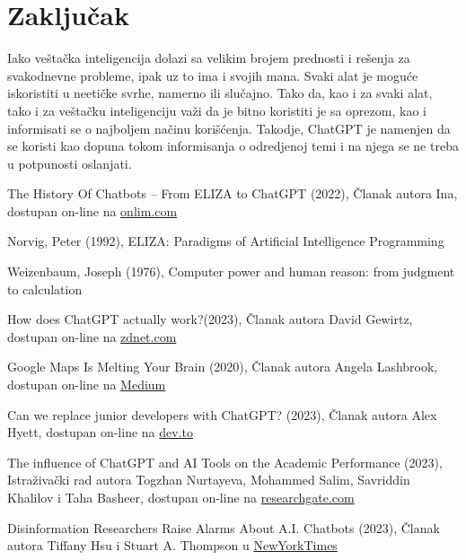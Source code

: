 \documentclass[fleqn, 12pt]{article}
\begin{document}
\newpage
\section{Zaključak}
\begin{text}
Iako veštačka inteligencija dolazi sa velikim brojem prednosti i  rešenja za svakodnevne probleme, ipak uz to ima i svojih mana. Svaki alat je moguće iskoristiti u neetičke svrhe, namerno ili slučajno. Tako da, kao i za svaki alat, tako i za veštačku inteligenciju važi da je bitno koristiti je sa oprezom, kao i informisati se o najboljem načinu korišćenja. Takodje, ChatGPT je namenjen da se koristi kao dopuna tokom informisanja o odredjenoj temi i na njega se ne treba u potpunosti oslanjati.

\end{text}
{
\raggedright
\renewcommand{\refname}{Reference}
\begin{thebibliography}{9}
     The History Of Chatbots – From ELIZA to ChatGPT (2022), Članak autora Ina, dostupan on-line na \href{https://onlim.com/en/the-history-of-chatbots/}{onlim.com}
    
     Norvig, Peter (1992), ELIZA: Paradigms of Artificial Intelligence Programming
    
     Weizenbaum, Joseph (1976), Computer power and human reason: from judgment to calculation
    
     How does ChatGPT actually work?(2023), Članak autora David Gewirtz, dostupan on-line na \href{https://www.zdnet.com/article/how-does-chatgpt-work/}{zdnet.com}
    
     Google Maps Is Melting Your Brain (2020), Članak autora Angela Lashbrook, dostupan on-line na \href{https://debugger.medium.com/google-maps-is-melting-your-brain-a9b34adc0936}{Medium}
    
     Can we replace junior developers with ChatGPT? (2023), Članak autora Alex Hyett, dostupan on-line na  \href{https://dev.to/alexhyettdev/can-we-replace-junior-developers-with-chatgpt-343h }{dev.to}
    
     The influence of ChatGPT and AI Tools on the Academic Performance (2023), Istraživački rad autora Togzhan Nurtayeva, Mohammed Salim, Savriddin Khalilov i Taha Basheer, dostupan on-line na \href{https://www.researchgate.net/publication/371405528_The_influence_of_ChatGPT_and_AI_Tools_on_the_Academic_Performance}{researchgate.com}
        
     Disinformation Researchers Raise Alarms About A.I. Chatbots (2023), Članak autora Tiffany Hsu i Stuart A. Thompson u \href{https://www.nytimes.com/2023/02/08/technology/ai-chatbots-disinformation.html}{NewYorkTimes}
        

\end{thebibliography}}
\end{document}
